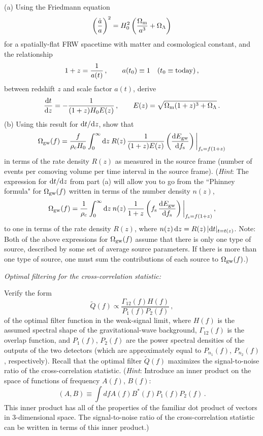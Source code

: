 \documentclass[11pt]{article}
\numberwithin{equation}{section}
\def\be{\begin{equation}}
\def\ee{\end{equation}}
\def\i{\item{}}
\def\D{{\rm d}}
\begin{document}
(a) Using the Friedmann equation
%
\be
\left(\frac{\dot a}{a}\right)^2
=H_0^2\left(\frac{\Omega_{\rm m}}{a^{3}} + \Omega_\Lambda\right)
\ee
%
for a spatially-flat FRW spacetime with matter and 
cosmological constant, and the relationship 
%
\be
1+z = \frac{1}{a(t)}\,,
\qquad a(t_0)\equiv 1\quad(t_0\equiv {\rm today})\,,
\ee
%
between redshift $z$ and scale factor $a(t)$,
derive 
%
\be
\frac{\D t}{\D z} =-\frac{1}{(1+z)H_0 E(z)}\,,
\qquad
E(z) = \sqrt{\Omega_{\rm m}(1+z)^3 + \Omega_\Lambda}\,.
\ee
%
(b) Using this result for $\D t/\D z$, show that 
%
\be
\Omega_{\rm gw}(f)= \frac{f}{\rho_{\rm c}H_0}
\int_0^\infty \D z\>R(z)\,\frac{1}{(1+z)E(z)}
\left(\frac{\D E_{\rm gw}}{\D f_{\rm s}}\right)\bigg|_{f_{\rm s}=f(1+z)}
\ee
%
in terms of the rate density $R(z)$ as measured in 
the source frame 
(number of events per comoving volume per time interval
in the source frame).
({\em Hint}: The expression for $\D t/\D z$ from part
(a) will allow 
you to go from the ``Phinney formula" for
$\Omega_{\rm gw}(f)$ written in terms of the number 
density $n(z)$,
%
\be
\Omega_{\rm gw}(f)= \frac{1}{\rho_c}\int_0^\infty \D z\>
n(z)\,\frac{1}{1+z}\left(f_{\rm s}\,
\frac{\D E_{\rm gw}}{\D f_{\rm s}}\right)\bigg|_{f_{\rm s}=f(1+z)}\,,
\ee
%
to one in terms of the rate density 
$R(z)$, where $n(z)\,\D z=R(z)\,|\D t|_{t=t(z)}$.
Note: Both of the above expressions for $\Omega_{\rm gw}(f)$
assume that there is only one type of source, described by 
some set of average source parameters.  
If there is more than one type of source, one must sum
the contributions of each source to $\Omega_{\rm gw}(f)$.)

\i {\em Optimal filtering for the cross-correlation statistic:}

Verify the form 
%
\be
\tilde Q(f)\propto \frac{\Gamma_{12}(f)H(f)}
{P_1(f)P_2(f)}\,,
\ee
of the optimal filter function in the weak-signal limit,
where $H(f)$ is the assumed spectral shape of the 
gravitational-wave background,
$\Gamma_{12}(f)$ is the overlap function, and $P_1(f)$, $P_2(f)$ 
are the power spectral densities of the outputs of the 
two detectors (which are approximately equal to 
$P_{n_1}(f)$, $P_{n_2}(f)$, respectively).
Recall that the optimal filter $\tilde Q(f)$ maximizes
the signal-to-noise ratio of the cross-correlation 
statistic.
({\em Hint}: Introduce an inner product on the space of
functions of frequency $A(f)$, $B(f)$:
%
\be
(A,B)\equiv\int df A(f) B^*(f) P_1(f) P_2(f)\,.
\ee
%
This inner product
has all of the properties of the familiar dot product
of vectors in 3-dimensional space.
The signal-to-noise ratio of the cross-correlation
statistic can be written in terms of this inner product.)
\end{document}
